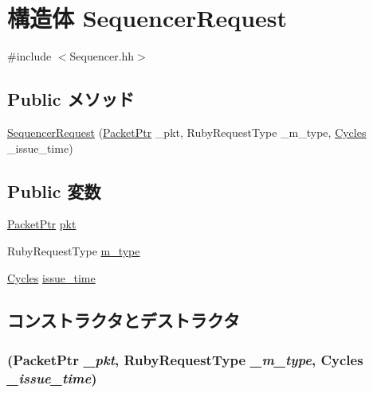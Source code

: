 \hypertarget{structSequencerRequest}{
\section{構造体 SequencerRequest}
\label{structSequencerRequest}
}


{\ttfamily \#include $<$Sequencer.hh$>$}\subsection*{Public メソッド}
\begin{DoxyCompactItemize}
\item 
\hyperlink{structSequencerRequest_afdb00f90acab3e58a56b74ee3da13b2f}{SequencerRequest} (\hyperlink{classPacket}{PacketPtr} \_\-pkt, RubyRequestType \_\-m\_\-type, \hyperlink{classCycles}{Cycles} \_\-issue\_\-time)
\end{DoxyCompactItemize}
\subsection*{Public 変数}
\begin{DoxyCompactItemize}
\item 
\hyperlink{classPacket}{PacketPtr} \hyperlink{structSequencerRequest_a3a891bc2a0fcbe6be5297077d94e2df7}{pkt}
\item 
RubyRequestType \hyperlink{structSequencerRequest_a7d010f0854d320898448eae2da5997f8}{m\_\-type}
\item 
\hyperlink{classCycles}{Cycles} \hyperlink{structSequencerRequest_aa9c7c90a6f11931d8a6f2f9736929679}{issue\_\-time}
\end{DoxyCompactItemize}


\subsection{コンストラクタとデストラクタ}
\hypertarget{structSequencerRequest_afdb00f90acab3e58a56b74ee3da13b2f}{
\subsubsection[{SequencerRequest}]{ ({\bf PacketPtr} {\em \_\-pkt}, \/  RubyRequestType {\em \_\-m\_\-type}, \/  {\bf Cycles} {\em \_\-issue\_\-time})}}
\label{structSequencerRequest_afdb00f90acab3e58a56b74ee3da13b2f}



